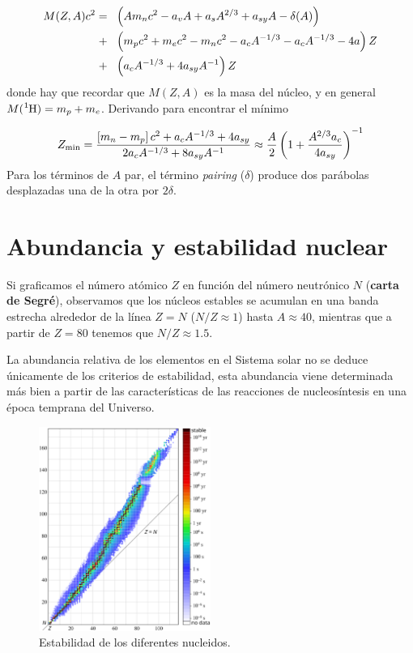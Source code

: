\begin{equation}
	\begin{split}
	M(Z,A)c^2  = \ & \ \left( Am_n c^2 - a_v A + a_s A^{2/3} +a_{sy} A - \delta (A) \right) \\
	 + \ & \ \left( m_p c^2 + m_e c^2 - m_n c^2 - a_c A^{-1/3} - a_cA^{-1/3} - 4a \right)Z \\
	 + \ & \ \left( a_c A^{-1/3}+4a_{sy}A^{-1} \right)Z
	\end{split}
\end{equation}
donde hay que recordar que $M(Z,A)$ es la masa del núcleo, y en general $M(\ce{^1H})=m_p+m_e$. Derivando para encontrar el mínimo

\begin{eqnarray}
	Z_{\min} = \frac{\left[ m_n - m_p \right]c^2 + a_c A^{-1/3}+4a_{sy}}{2a_c A^{-1/3} + 8 a_{sy} A^{-1}} \approx \frac{A}{2} \left( 1+\frac{A^{2/3}a_c}{4a_{sy}} \right)^{-1}
\end{eqnarray}
Para los términos de $A$ par, el término \textit{pairing} ($\delta$) produce dos parábolas desplazadas una de la otra por $2\delta$. 


\section{Abundancia y estabilidad nuclear}

Si graficamos el número atómico $Z$ en función del número neutrónico $N$ (\textbf{carta de Segré}), observamos que los núcleos estables se acumulan en una banda estrecha alrededor de la línea $Z=N$ ($N/Z\approx 1$) hasta $A\approx 40$, mientras que a partir de $Z=80$ tenemos que $N/Z\approx 1.5$.

La abundancia relativa de los elementos en el Sistema solar no se deduce únicamente de los criterios de estabilidad, esta abundancia viene determinada más bien a partir de las características de las reacciones de nucleosíntesis en una época temprana del Universo. 

\begin{figure}[h!] \centering
	\includegraphics[width=0.5\textwidth]{Imagenes/Half-life.eps}
	\caption{Estabilidad de los diferentes nucleidos.}
\end{figure}


